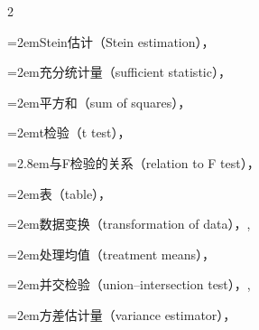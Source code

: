 \begin{multicols}{2}
\par\noindent\hangindent=2em\hspace*{1em}\label{idx:48}Stein估计（Stein estimation），\hyperref[sec:11.5.6]{\pageref*{sec:11.5.6}}\par
\par\noindent\hangindent=2em\hspace*{1em}\label{idx:49}充分统计量（sufficient statistic），\hyperref[item:11.6.a]{\pageref*{item:11.6.a}}\par
\par\noindent\hangindent=2em\hspace*{1em}\label{idx:50}平方和（sum of squares），\hyperref[thm:11.2.11]{\pageref*{thm:11.2.11}}\par
\par\noindent\hangindent=2em\hspace*{1em}\label{idx:51}t检验（t test），\hyperref[eq:11.2.7]{\pageref*{eq:11.2.7}}\par
\par\noindent\hangindent=2.8em\hspace*{1.8em}\label{idx:52}与F检验的关系（relation to F test），\hyperref[exercise:11.12]{\pageref*{exercise:11.12}}\par
\par\noindent\hangindent=2em\hspace*{1em}\label{idx:53}表（table），\hyperref[ex:11.2.12]{\pageref*{ex:11.2.12}}\par
\par\noindent\hangindent=2em\hspace*{1em}\label{idx:54}数据变换（transformation of data），\hyperref[idxocc:54:455]{\pageref*{idxocc:54:455}}, \hyperref[exercise:11.1]{\pageref*{exercise:11.1}}\par
\par\noindent\hangindent=2em\hspace*{1em}\label{idx:55}处理均值（treatment means），\hyperref[idxocc:55:453]{\pageref*{idxocc:55:453}}\par
\par\noindent\hangindent=2em\hspace*{1em}\label{idx:56}并交检验（union–intersection test），\hyperref[thm:11.2.5]{\pageref*{thm:11.2.5}}, \hyperref[sec:11.2.4]{\pageref*{sec:11.2.4}}\par
\par\noindent\hangindent=2em\hspace*{1em}\label{idx:57}方差估计量（variance estimator），\hyperref[eq:11.2.5]{\pageref*{eq:11.2.5}}\par

\end{multicols}
